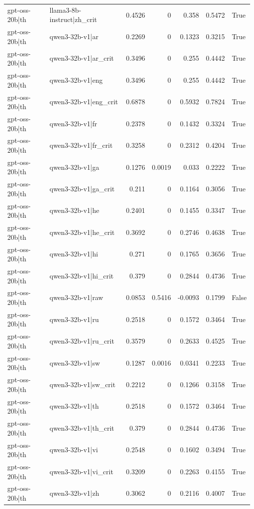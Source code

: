 \begin{table}
\begin{tabular}{l l r r r r l}
gpt-oss-20b|th & llama3-8b-instruct|zh_crit & 0.4526 & 0 & 0.358 & 0.5472 & True \\
gpt-oss-20b|th & qwen3-32b-v1|ar & 0.2269 & 0 & 0.1323 & 0.3215 & True \\
gpt-oss-20b|th & qwen3-32b-v1|ar_crit & 0.3496 & 0 & 0.255 & 0.4442 & True \\
gpt-oss-20b|th & qwen3-32b-v1|eng & 0.3496 & 0 & 0.255 & 0.4442 & True \\
gpt-oss-20b|th & qwen3-32b-v1|eng_crit & 0.6878 & 0 & 0.5932 & 0.7824 & True \\
gpt-oss-20b|th & qwen3-32b-v1|fr & 0.2378 & 0 & 0.1432 & 0.3324 & True \\
gpt-oss-20b|th & qwen3-32b-v1|fr_crit & 0.3258 & 0 & 0.2312 & 0.4204 & True \\
gpt-oss-20b|th & qwen3-32b-v1|ga & 0.1276 & 0.0019 & 0.033 & 0.2222 & True \\
gpt-oss-20b|th & qwen3-32b-v1|ga_crit & 0.211 & 0 & 0.1164 & 0.3056 & True \\
gpt-oss-20b|th & qwen3-32b-v1|he & 0.2401 & 0 & 0.1455 & 0.3347 & True \\
gpt-oss-20b|th & qwen3-32b-v1|he_crit & 0.3692 & 0 & 0.2746 & 0.4638 & True \\
gpt-oss-20b|th & qwen3-32b-v1|hi & 0.271 & 0 & 0.1765 & 0.3656 & True \\
gpt-oss-20b|th & qwen3-32b-v1|hi_crit & 0.379 & 0 & 0.2844 & 0.4736 & True \\
gpt-oss-20b|th & qwen3-32b-v1|raw & 0.0853 & 0.5416 & -0.0093 & 0.1799 & False \\
gpt-oss-20b|th & qwen3-32b-v1|ru & 0.2518 & 0 & 0.1572 & 0.3464 & True \\
gpt-oss-20b|th & qwen3-32b-v1|ru_crit & 0.3579 & 0 & 0.2633 & 0.4525 & True \\
gpt-oss-20b|th & qwen3-32b-v1|sw & 0.1287 & 0.0016 & 0.0341 & 0.2233 & True \\
gpt-oss-20b|th & qwen3-32b-v1|sw_crit & 0.2212 & 0 & 0.1266 & 0.3158 & True \\
gpt-oss-20b|th & qwen3-32b-v1|th & 0.2518 & 0 & 0.1572 & 0.3464 & True \\
gpt-oss-20b|th & qwen3-32b-v1|th_crit & 0.379 & 0 & 0.2844 & 0.4736 & True \\
gpt-oss-20b|th & qwen3-32b-v1|vi & 0.2548 & 0 & 0.1602 & 0.3494 & True \\
gpt-oss-20b|th & qwen3-32b-v1|vi_crit & 0.3209 & 0 & 0.2263 & 0.4155 & True \\
gpt-oss-20b|th & qwen3-32b-v1|zh & 0.3062 & 0 & 0.2116 & 0.4007 & True \\

\end{tabular}
\end{table}
